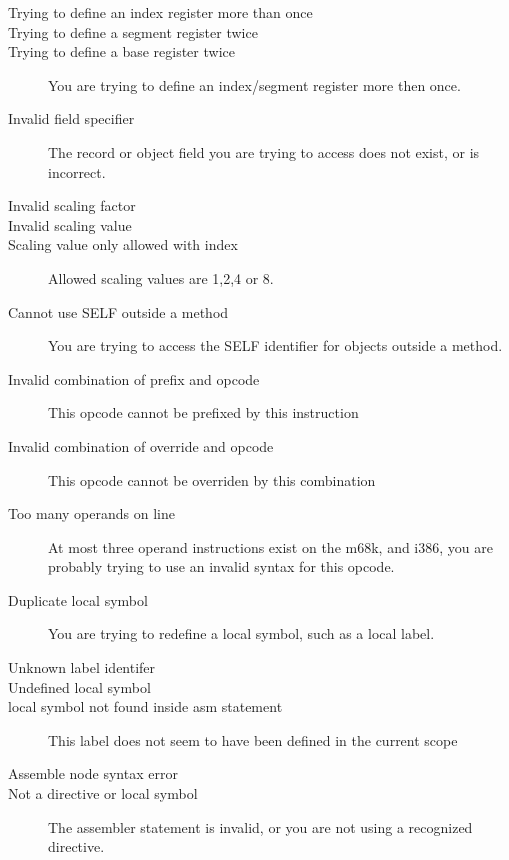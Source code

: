 \begin{description}
\item [Trying to define an index register more than once]
\item [Trying to define a segment register twice]
\item [Trying to define a base register twice]
You are trying to define an index/segment register more then once.

\item [Invalid field specifier]
The record or object field you are trying to access does not exist, or
is incorrect.

\item [Invalid scaling factor]
\item [Invalid scaling value]
\item [Scaling value only allowed with index]
Allowed scaling values are 1,2,4 or 8.


\item [Cannot use SELF outside a method]
You are trying to access the SELF identifier for objects outside a method.


\item [Invalid combination of prefix and opcode]
This opcode cannot be prefixed by this instruction

\item [Invalid combination of override and opcode]
This opcode cannot be overriden by this combination

\item [Too many operands on line]
At most three operand instructions exist on the m68k, and i386, you
are probably trying to use an invalid syntax for this opcode.

\item [Duplicate local symbol]
You are trying to redefine a local symbol, such as a local label.

\item [Unknown label identifer]
\item [Undefined local symbol]
\item [local symbol not found inside asm statement]
This label does not seem to have been defined in the current scope


\item [Assemble node syntax error]
\item [Not a directive or local symbol]
The assembler statement is invalid, or you are not using a recognized
directive.

\end{description}

